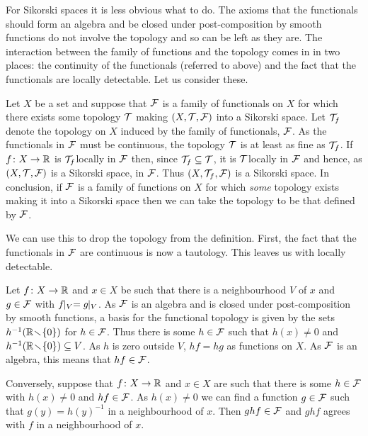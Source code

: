 \documentclass[%
12pt,%
arxiv,%
defaults
]{myclass}
\begin{document}
For Sikorski spaces it is less obvious what to do.
The axioms that the functionals should form an algebra and be closed under post\hyp{}composition by smooth functions do not involve the topology and so can be left as they are.
The interaction between the family of functions and the topology comes in in two places: the continuity of the functionals (referred to above) and the fact that the functionals are locally detectable.
Let us consider these.

Let \(X\) be a set and suppose that \(\mathcal{F}\) is a family of functionals on \(X\) for which there exists some topology \(\mathcal{T}\) making \((X, \mathcal{T}, \mathcal{F})\) into a Sikorski space.
Let \(\mathcal{T}_f\) denote the topology on \(X\) induced by the family of functionals, \(\mathcal{F}\).
As the functionals in \(\mathcal{F}\) must be continuous, the topology \(\mathcal{T}\) is at least as fine as \(\mathcal{T}_f\).
If \(f \colon X \to \mathbb{R}\) is \(\mathcal{T}_f\)\enhyp{}locally in \(\mathcal{F}\) then, since \(\mathcal{T}_f \subseteq \mathcal{T}\), it is \(\mathcal{T}\)\enhyp{}locally in \(\mathcal{F}\) and hence, as \((X, \mathcal{T}, \mathcal{F})\) is a Sikorski space, in \(\mathcal{F}\).
Thus \((X, \mathcal{T}_f, \mathcal{F})\) is a Sikorski space.
In conclusion, if \(\mathcal{F}\) is a family of functions on \(X\) for which \emph{some} topology exists making it into a Sikorski space then we can take the topology to be that defined by \(\mathcal{F}\).

We can use this to drop the topology from the definition.
First, the fact that the functionals in \(\mathcal{F}\) are continuous is now a tautology.
This leaves us with locally detectable.

Let \(f \colon X \to \mathbb{R}\) and \(x \in X\) be such that there is a neighbourhood \(V\) of \(x\) and \(g \in \mathcal{F}\) with \(f \!\!\mid_V = g \!\!\mid_V\).
As \(\mathcal{F}\) is an algebra and is closed under post\hyp{}composition by smooth functions, a basis for the functional topology is given by the sets \(h^{-1}(\mathbb{R} \!\smallsetminus\! \{0\})\) for \(h \in \mathcal{F}\).
Thus there is some \(h \in \mathcal{F}\) such that \(h(x) \ne 0\) and \(h^{-1}(\mathbb{R} \!\smallsetminus\! \{0\}) \subseteq V\).
As \(h\) is zero outside \(V\), \(h f = h g\) as functions on \(X\).
As \(\mathcal{F}\) is an algebra, this means that \(h f \in \mathcal{F}\).

Conversely, suppose that \(f \colon X \to \mathbb{R}\) and \(x \in X\) are such that there is some \(h \in \mathcal{F}\) with \(h(x) \ne 0\) and \(h f \in \mathcal{F}\).
As \(h(x) \ne 0\) we can find a function \(g \in \mathcal{F}\) such that \(g(y) = h(y)^{-1}\) in a neighbourhood of \(x\).
Then \(g h f \in \mathcal{F}\) and \(g h f\) agrees with \(f\) in a neighbourhood of \(x\).
\end{document}
